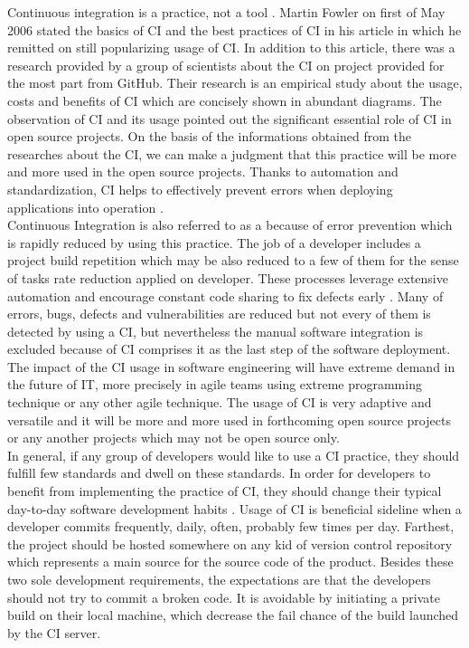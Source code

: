 Continuous integration is a practice, not a tool \cite{CollabNet}. Martin Fowler on first of May 2006 stated the basics of CI and the best practices of CI in his article in which he remitted on still popularizing usage of CI. In addition to this article, there was a research provided by a group of scientists about the CI on project provided for the most part from GitHub. Their research is an empirical study about the usage, costs and benefits of CI which are concisely shown in abundant diagrams. The observation of CI and its usage pointed out the significant essential role of CI in open source projects. On the basis of the informations obtained from the researches about the CI, we can make a judgment that this practice will be more and more used in the open source projects. Thanks to automation and standardization, CI helps to effectively prevent errors when deploying applications into operation \cite{CIcure}.\\

Continuous Integration is also referred to as a  \cite{CIcure} because of error prevention which is rapidly reduced by using this practice. The job of a developer includes a project build repetition which may be also reduced to a few of them for the sense of tasks rate reduction applied on developer. These processes leverage extensive automation and encourage constant code sharing to fix defects early \cite{DigitalOceanCI}. Many of errors, bugs, defects and vulnerabilities are reduced but not every of them is detected by using a CI, but nevertheless the manual software integration is excluded because of CI comprises it as the last step of the software deployment. The impact of the CI usage in software engineering will have extreme demand in the future of IT, more precisely in agile teams using extreme programming technique or any other agile technique. The usage of CI is very adaptive and versatile and it will be more and more used in forthcoming open source projects or any another projects which may not be open source only.\\

In general, if any group of developers would like to use a CI practice, they should fulfill few standards and dwell on these standards. In order for developers to benefit from implementing the practice of CI, they should change their typical day-to-day software development habits \cite{CIQualityFramework}. Usage of CI is beneficial sideline when a developer commits frequently, daily, often, probably few times per day. Farthest, the project should be hosted somewhere on any kid of version control repository which represents a main source for the source code of the product. Besides these two sole development requirements, the expectations are that the developers should not try to commit a broken code. It is avoidable by initiating a private build on their local machine, which decrease the fail chance of the build launched by the CI server.\\

